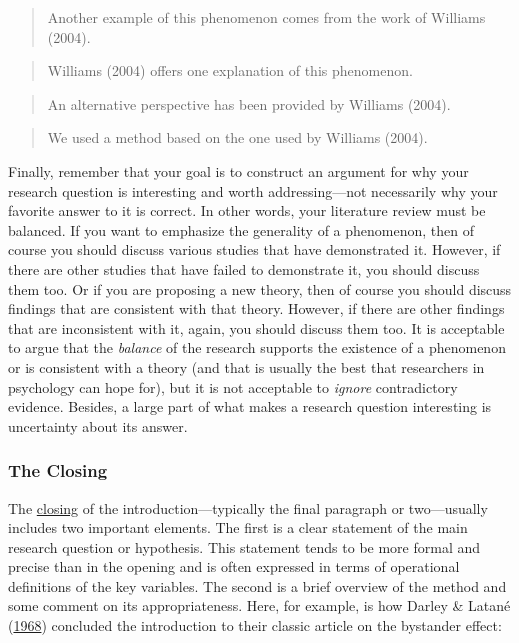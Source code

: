 \documentclass[
]{krantz}
\begin{document}
\begin{quote}
Another example of this phenomenon comes from the work of Williams (2004).
\end{quote}

\begin{quote}
Williams (2004) offers one explanation of this phenomenon.
\end{quote}

\begin{quote}
An alternative perspective has been provided by Williams (2004).
\end{quote}

\begin{quote}
We used a method based on the one used by Williams (2004).
\end{quote}

Finally, remember that your goal is to construct an argument for why your research question is interesting and worth addressing---not necessarily why your favorite answer to it is correct. In other words, your literature review must be balanced. If you want to emphasize the generality of a phenomenon, then of course you should discuss various studies that have demonstrated it. However, if there are other studies that have failed to demonstrate it, you should discuss them too. Or if you are proposing a new theory, then of course you should discuss findings that are consistent with that theory. However, if there are other findings that are inconsistent with it, again, you should discuss them too. It is acceptable to argue that the \emph{balance} of the research supports the existence of a phenomenon or is consistent with a theory (and that is usually the best that researchers in psychology can hope for), but it is not acceptable to \emph{ignore} contradictory evidence. Besides, a large part of what makes a research question interesting is uncertainty about its answer.

\hypertarget{the-closing}{%
\subsubsection*{The Closing}\label{the-closing}}


The \protect\hyperlink{closing}{closing} of the introduction---typically the final paragraph or two---usually includes two important elements. The first is a clear statement of the main research question or hypothesis. This statement tends to be more formal and precise than in the opening and is often expressed in terms of operational definitions of the key variables. The second is a brief overview of the method and some comment on its appropriateness. Here, for example, is how Darley \& Latané (\protect\hyperlink{ref-darley1968bystander}{1968}) concluded the introduction to their classic article on the bystander effect:
\end{document}
